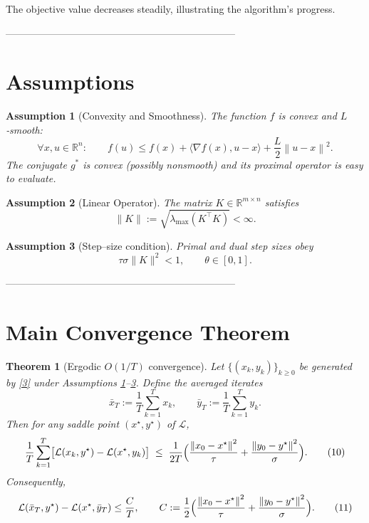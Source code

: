 \documentclass{article}
\newtheorem{theorem}{Theorem}
\newtheorem{assumption}{Assumption}
\newcommand{\inner}[2]{\langle #1,#2\rangle}
\newcommand{\norm}[1]{\left\|#1\right\|}
\begin{document}
The objective value decreases steadily, illustrating the algorithm’s progress.

---------------------------------------------------------------------

\section*{Assumptions}

\begin{assumption}[Convexity and Smoothness]\label{ass:convex}
The function $f$ is convex and $L$‑smooth:
\[
\forall x,u\in\mathbb{R}^{n}:\qquad
f(u)\le f(x)+\inner{\nabla f(x)}{u-x}+\frac{L}{2}\norm{u-x}^{2}.
\tag{7}
\]
The conjugate $g^{*}$ is convex (possibly nonsmooth) and its proximal operator is easy to evaluate.
\end{assumption}

\begin{assumption}[Linear Operator]\label{ass:K}
The matrix $K\in\mathbb{R}^{m\times n}$ satisfies
\[
\|K\|:=\sqrt{\lambda_{\max}(K^{\top}K)}<\infty .
\tag{8}
\]
\end{assumption}

\begin{assumption}[Step–size condition]\label{ass:steps}
Primal and dual step sizes obey
\[
\tau\sigma\|K\|^{2}<1,\qquad \theta\in[0,1].
\tag{9}
\]
\end{assumption}

---------------------------------------------------------------------

\section*{Main Convergence Theorem}

\begin{theorem}[Ergodic $O(1/T)$ convergence]\label{thm:main}
Let $\{(x_{k},y_{k})\}_{k\ge0}$ be generated by \eqref{3} under Assumptions \ref{ass:convex}–\ref{ass:steps}.
Define the averaged iterates
\[
\bar{x}_{T}:=\frac{1}{T}\sum_{k=1}^{T}x_{k},\qquad
\bar{y}_{T}:=\frac{1}{T}\sum_{k=1}^{T}y_{k}.
\]
Then for any saddle point $(x^{\star},y^{\star})$ of $\mathcal{L}$,
\[
\frac{1}{T}\sum_{k=1}^{T}\bigl[\mathcal{L}(x_{k},y^{\star})-\mathcal{L}(x^{\star},y_{k})\bigr]
\;\le\;
\frac{1}{2T}\Bigl(
\frac{\norm{x_{0}-x^{\star}}^{2}}{\tau}
+\frac{\norm{y_{0}-y^{\star}}^{2}}{\sigma}
\Bigr).
\tag{10}
\]
Consequently,
\[
\mathcal{L}(\bar{x}_{T},y^{\star})-\mathcal{L}(x^{\star},\bar{y}_{T})\le
\frac{C}{T},
\qquad C:=\frac{1}{2}\Bigl(
\frac{\norm{x_{0}-x^{\star}}^{2}}{\tau}
+\frac{\norm{y_{0}-y^{\star}}^{2}}{\sigma}
\Bigr).
\tag{11}
\]
\end{theorem}
\end{document}
